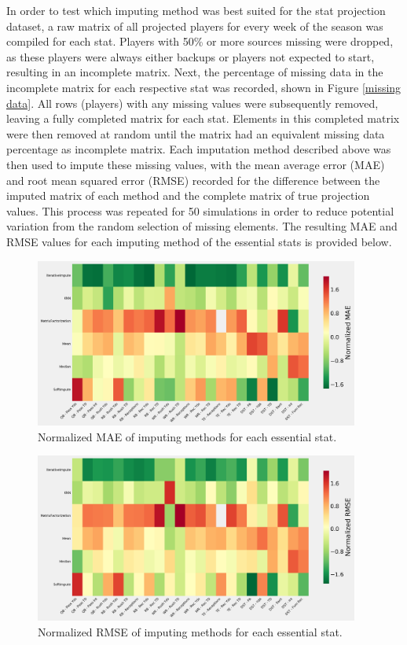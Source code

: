 \documentclass[12pt]{article}
\begin{document}
In order to test which imputing method was best suited for the stat projection dataset, a raw matrix of all projected players for every week of the season was compiled for each stat. Players with 50\% or more sources missing were dropped, as these players were always either backups or players not expected to start, resulting in an incomplete matrix. Next, the percentage of missing data in the incomplete matrix for each respective stat was recorded, shown in Figure \ref{missing data}. All rows (players) with any missing values were subsequently removed, leaving a fully completed matrix for each stat. Elements in this completed matrix were then removed at random until the matrix had an equivalent missing data percentage as incomplete matrix. Each imputation method described above was then used to impute these missing values, with the mean average error (MAE) and root mean squared error (RMSE) recorded for the difference between the imputed matrix of each method and the complete matrix of true projection values. This process was repeated for 50 simulations in order to reduce potential variation from the random selection of missing elements. The resulting MAE and RMSE values for each imputing method of the essential stats is provided below. 


\begin{figure}[H]
  \centering
  \includegraphics[width=0.95\textwidth]{../figures/impute_MAE}
  \caption{Normalized MAE of imputing methods for each essential stat.}
  \label{impute MAE}
\end{figure}

\begin{figure}[H]
  \centering
  \includegraphics[width=0.95\textwidth]{../figures/impute_RMSE}
  \caption{Normalized RMSE of imputing methods for each essential stat.}
  \label{impute RMSE}
\end{figure}
\end{document}
